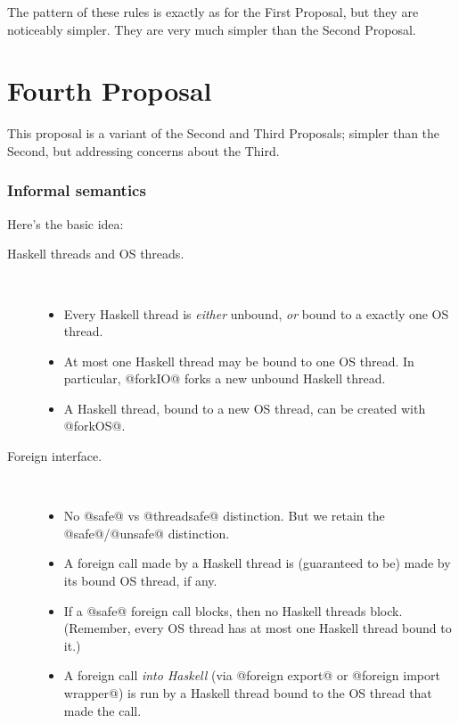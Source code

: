 \documentclass{article}
\begin{document}
The pattern of these rules is exactly as for the First Proposal, but they are noticeably simpler.
They are very much simpler than the Second Proposal.

\newpage
\part{Fourth Proposal}

This proposal is a variant of the Second and Third Proposals; simpler than the Second,
but addressing concerns about the Third.

\section{Informal semantics}

Here's the basic idea:
\begin{description}
\item[Haskell threads and OS threads.] \mbox{}\\
\begin{itemize}
\item Every Haskell thread is \emph{either} unbound, \emph{or} bound to a exactly one OS thread.  

\item At most one Haskell thread may be bound to one OS thread.
In particular, @forkIO@ forks a new unbound Haskell thread.

\item A Haskell thread, bound to a new OS thread, can be created with @forkOS@.

\end{itemize}

\item[Foreign interface.] \mbox{}\\
\begin{itemize}
\item No @safe@ vs @threadsafe@ distinction. But we retain the @safe@/@unsafe@ distinction.
\item A foreign call made by a Haskell thread is (guaranteed to be) made by its bound OS thread, if
any.

\item If a @safe@ foreign call blocks, then no Haskell threads block.  (Remember, every OS thread
has at most one Haskell thread bound to it.)

\item A foreign call \emph{into Haskell} (via @foreign export@ or @foreign import wrapper@) is 
run by a Haskell thread bound to the OS thread that made the call.
\end{itemize}



\end{description}
\end{document}
